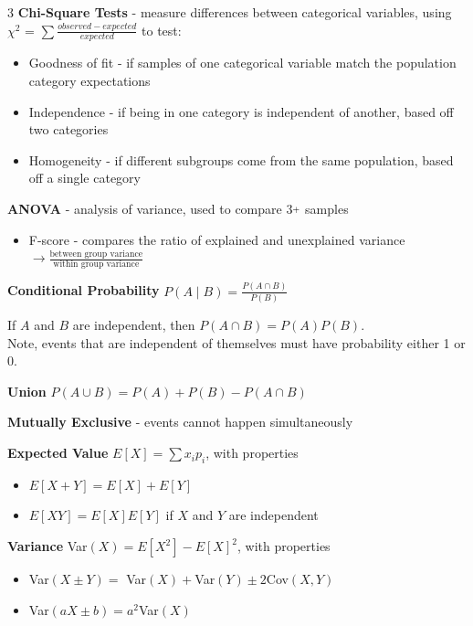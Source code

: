\documentclass[10pt,landscape,letterpaper]{article}
\newcommand{\plus}{\raisebox{.3\height}{\scalebox{.7}{+}}}
\begin{document}
\begin{multicols}{3}
\textbf{Chi-Square Tests} - measure differences between categorical variables, using $\chi^2$ = $\sum \frac{observed - expected}{expected}$ to test:
\begin{itemize}[label={--},leftmargin=4mm]
    \itemsep -.4mm
    \item Goodness of fit - if samples of one categorical variable match the population category expectations
    \item Independence -  if being in one category is independent of another, based off two categories
    \item Homogeneity - if different subgroups come from the same population, based off a single category
\end{itemize}

\textbf{ANOVA} - analysis of variance, used to compare 3$\plus$ samples
\begin{itemize}[label={--},leftmargin=4mm]
    \itemsep -.4mm
    \item F-score - compares the ratio of explained and unexplained variance $\to \frac{\text{between group variance}}{\text{within group variance}}$
\end{itemize}

\smallskip

\textbf{Conditional Probability} $P(A \mid B) = \frac{P(A \cap B)}{P(B)}$

If $A$ and $B$ are independent, then $P(A \cap B) = P(A) P(B)$.\\
Note, events that are independent of themselves must have
probability either 1 or 0.


\textbf{Union} $P(A \cup B) = P(A) + P(B) - P(A \cap B) $

\textbf{Mutually Exclusive} - events cannot happen simultaneously
\smallskip

\textbf{Expected Value} $E[X] = \sum x_i p_i$, with properties
    \begin{itemize}[label={--},leftmargin=4mm]
    \itemsep -.4mm
    \item $E[X + Y] = E[X] + E[Y]$
    \item $E[XY] = E[X]E[Y]$ if $X$ and $Y$ are independent
    \end{itemize}

\textbf{Variance} Var$(X) = E[X^2] - E[X]^2$, with properties
    \begin{itemize}[label={--},leftmargin=4mm]
    \itemsep -.4mm
    \item Var$(X\pm Y) =$ Var$(X) +$Var$(Y) \pm 2$Cov$(X,Y)$
    \item Var$(aX \pm b) = a^2$Var$(X)$
    \end{itemize}


\end{multicols}
\end{document}
